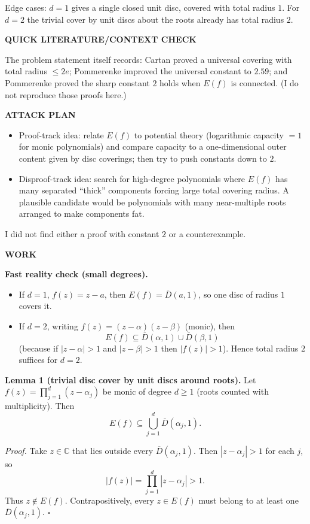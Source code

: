 Edge cases: $d=1$ gives a single closed unit disc, covered with total radius $1$. For $d=2$ the trivial cover by unit discs about the roots already has total radius $2$.

\medskip
\noindent\textbf{QUICK LITERATURE/CONTEXT CHECK}

The problem statement itself records: Cartan proved a universal covering with total radius $\le 2e$; Pommerenke improved the universal constant to $2.59$; and Pommerenke proved the sharp constant $2$ holds when $E(f)$ is connected. (I do not reproduce those proofs here.)

\medskip
\noindent\textbf{ATTACK PLAN}

\begin{itemize}
\item Proof-track idea: relate $E(f)$ to potential theory (logarithmic capacity $=1$ for monic polynomials) and compare capacity to a one-dimensional outer content given by disc coverings; then try to push constants down to $2$.
\item Disproof-track idea: search for high-degree polynomials where $E(f)$ has many separated ``thick'' components forcing large total covering radius. A plausible candidate would be polynomials with many near-multiple roots arranged to make components fat.
\end{itemize}
I did not find either a proof with constant $2$ or a counterexample.

\medskip
\noindent\textbf{WORK}

\noindent\textbf{Fast reality check (small degrees).}

\begin{itemize}
\item If $d=1$, $f(z)=z-a$, then $E(f)=\overline{D}(a,1)$, so one disc of radius $1$ covers it.
\item If $d=2$, writing $f(z)=(z-\alpha)(z-\beta)$ (monic), then
\[
E(f)\subseteq \overline{D}(\alpha,1)\cup \overline{D}(\beta,1)
\]
(because if $|z-\alpha|>1$ and $|z-\beta|>1$ then $|f(z)|>1$). Hence total radius $2$ suffices for $d=2$.
\end{itemize}

\medskip
\noindent\textbf{Lemma 1 (trivial disc cover by unit discs around roots).}
Let $f(z)=\prod_{j=1}^d (z-\alpha_j)$ be monic of degree $d\ge 1$ (roots counted with multiplicity). Then
\[
E(f)\subseteq \bigcup_{j=1}^d \overline{D}(\alpha_j,1).
\]

\textit{Proof.}
Take $z\in\mathbb{C}$ that lies outside every $\overline{D}(\alpha_j,1)$. Then $|z-\alpha_j|>1$ for each $j$, so
\[
|f(z)|=\prod_{j=1}^d |z-\alpha_j| > 1.
\]
Thus $z\notin E(f)$. Contrapositively, every $z\in E(f)$ must belong to at least one $\overline{D}(\alpha_j,1)$.
\hfill$\square$

